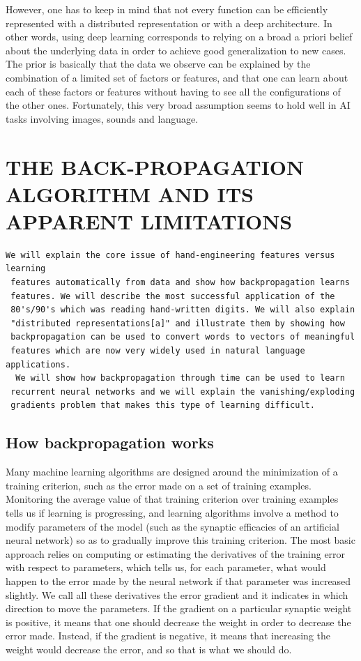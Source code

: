 \documentclass[11pt]{article} %
\begin{document}
However, one has to keep in mind that not every function can be efficiently
represented with a distributed representation or with a deep
architecture. In other words, using deep learning corresponds to relying on
a broad a priori belief about the underlying data in order to achieve good
generalization to new cases. The prior is basically that the data we
observe can be explained by the combination of a limited set of factors or
features, and that one can learn about each of these factors or features
without having to see all the configurations of the other
ones. Fortunately, this very broad assumption seems to hold well in AI
tasks involving images, sounds and language.




\section{THE BACK-PROPAGATION ALGORITHM AND ITS APPARENT LIMITATIONS}


\begin{verbatim}
We will explain the core issue of hand-engineering features versus learning
 features automatically from data and show how backpropagation learns
 features. We will describe the most successful application of the
 80's/90's which was reading hand-written digits. We will also explain
 "distributed representations[a]" and illustrate them by showing how
 backpropagation can be used to convert words to vectors of meaningful
 features which are now very widely used in natural language applications.
  We will show how backpropagation through time can be used to learn
 recurrent neural networks and we will explain the vanishing/exploding
 gradients problem that makes this type of learning difficult.
\end{verbatim}

\subsection{How backpropagation works}

Many machine learning algorithms are designed around the minimization of a
training criterion, such as the error made on a set of training
examples. Monitoring the average value of that training criterion over
training examples tells us if learning is progressing, and learning
algorithms involve a method to modify parameters of the model (such as the
synaptic efficacies of an artificial neural network) so as to gradually
improve this training criterion. The most basic approach relies on
computing or estimating the derivatives of the training error with respect
to parameters, which tells us, for each parameter, what would happen to the
error made by the neural network if that parameter was increased
slightly. We call all these derivatives the error gradient and it indicates
in which direction to move the parameters. If the gradient on a particular
synaptic weight is positive, it means that one should decrease the weight
in order to decrease the error made. Instead, if the gradient is negative,
it means that increasing the weight would decrease the error, and so that
is what we should do.
\end{document}
